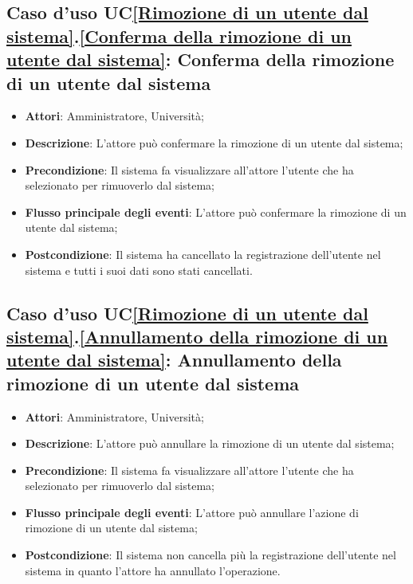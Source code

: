 \subsection{Caso d'uso UC\ref{Rimozione di un utente dal sistema}.\ref{Conferma della rimozione di un utente dal sistema}: Conferma della rimozione di un utente dal sistema}
\begin{itemize}
	\item \textbf{Attori}: Amministratore, Università;
	\item \textbf{Descrizione}: L'attore può confermare la rimozione di un utente dal sistema;
	\item \textbf{Precondizione}: Il sistema fa visualizzare all'attore l'utente che ha selezionato per rimuoverlo dal sistema;
	\item \textbf{Flusso principale degli eventi}: L'attore può confermare la rimozione di un utente dal sistema;
	\item \textbf{Postcondizione}: Il sistema ha cancellato la registrazione dell'utente nel sistema e tutti i suoi dati sono stati cancellati.
\end{itemize}

\subsection{Caso d'uso UC\ref{Rimozione di un utente dal sistema}.\ref{Annullamento della rimozione di un utente dal sistema}: Annullamento della rimozione di un utente dal sistema}
\begin{itemize}
	\item \textbf{Attori}: Amministratore, Università;
	\item \textbf{Descrizione}: L'attore può annullare la rimozione di un utente dal sistema;
	\item \textbf{Precondizione}: Il sistema fa visualizzare all'attore l'utente che ha selezionato per rimuoverlo dal sistema;
	
	\item \textbf{Flusso principale degli eventi}: L'attore può annullare l'azione di rimozione di un utente dal sistema;
	\item \textbf{Postcondizione}: Il sistema non cancella più la registrazione dell'utente nel sistema in quanto l'attore ha annullato l'operazione.
	
\end{itemize}


